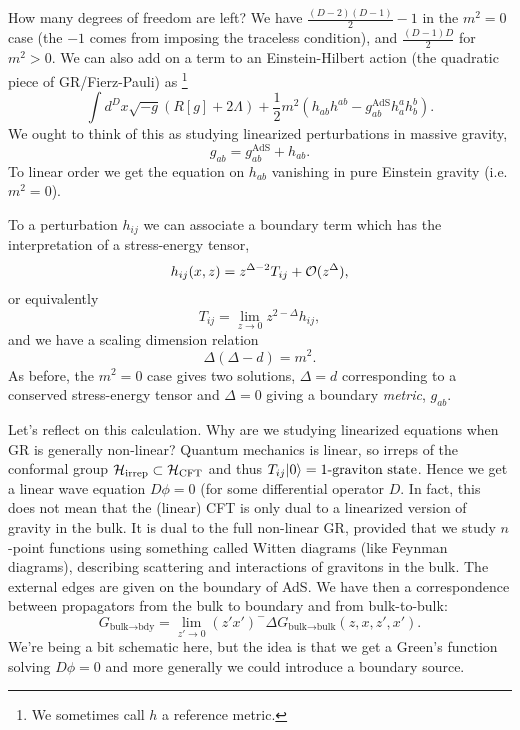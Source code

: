 How many degrees of freedom are left? We have $\frac{(D-2)(D-1)}{2}-1$ in the $m^2=0$ case (the $-1$ comes from imposing the traceless condition), and $\frac{(D-1)D}{2}$ for $m^2>0$. We can also add on a term to an Einstein-Hilbert action (the quadratic piece of GR/Fierz-Pauli) as%
    \footnote{We sometimes call $h$ a reference metric.}
\begin{equation}
    \int d^D x \sqrt{-g} (R[g]+2\Lambda) +\frac{1}{2} m^2( h_{ab} h^{ab} -g_{ab}^{\text{AdS}}h^a_a h^b_b).
\end{equation}
We ought to think of this as studying linearized perturbations in massive gravity,
\begin{equation}
    g_{ab} =g_{ab}^\text{AdS} + h_{ab}.
\end{equation}
To linear order we get the equation on $h_{ab}$ vanishing in pure Einstein gravity (i.e. $m^2=0$).

To a perturbation $h_{ij}$ we can associate a boundary term which has the interpretation of a stress-energy tensor,
\begin{equation}
    h_{ij}(x,z)= z^{\Delta-2} T_{ij} +\cO(z^\Delta),%
\end{equation}
or equivalently
\begin{equation}
    T_{ij} = \lim_{z\to 0} z^{2-\Delta} h_{ij},
\end{equation}
and we have a scaling dimension relation
\begin{equation}
    \Delta(\Delta-d) = m^2.
\end{equation}
As before, the $m^2=0$ case gives two solutions, $\Delta=d$ corresponding to a conserved stress-energy tensor and $\Delta=0$ giving a boundary \emph{metric}, $g_{ab}$.

Let's reflect on this calculation. Why are we studying linearized equations when GR is generally non-linear? Quantum mechanics is linear, so irreps of the conformal group $\mathcal H_\text{irrep} \subset \mathcal H_\text{CFT}$ and thus $T_{ij}\lvert0\rangle =\text{1-graviton state}$. Hence we get a linear wave equation $D\phi=0$ (for some differential operator $D$. In fact, this does not mean that the (linear) CFT is only dual to a linearized version of gravity in the bulk. It is dual to the full non-linear GR, provided that we study $n$-point functions using something called Witten diagrams (like Feynman diagrams), describing scattering and interactions of gravitons in the bulk. The external edges are given on the boundary of AdS. We have then a correspondence between propagators from the bulk to boundary and from bulk-to-bulk:
\begin{equation}
    G_{\text{bulk}\to\text{bdy}} = \lim_{z'\to 0} (z'x')^-\Delta G_{\text{bulk}\to\text{bulk}}(z,x,z',x').
\end{equation}
We're being a bit schematic here, but the idea is that we get a Green's function solving $D\phi=0$ and more generally we could introduce a boundary source.